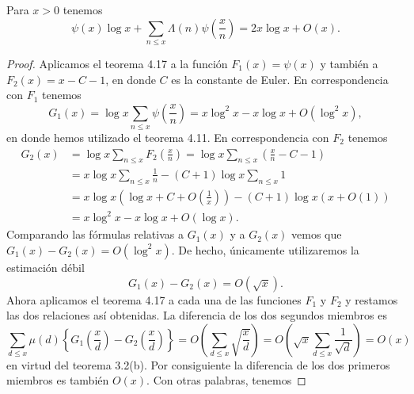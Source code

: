 \documentclass[12pt,a4paper]{book}
\begin{document}
    \begin{teorema}
        Para $x>0$ tenemos
        \begin{equation}
            \psi(x)\log x+\sum_{n\leq x}\Lambda(n)\psi\left(\frac{x}{n}\right)=2x\log x+O(x).
        \end{equation}
    \end{teorema}

    \begin{proof}
        Aplicamos el teorema 4.17 a la función $F_1(x)=\psi(x)$ y también a
        $F_2(x)=x-C-1$, en donde $C$ es la constante de Euler. En correspondencia con
        $F_1$ tenemos
        \begin{equation*}
            G_1(x)=\log x\sum_{n\leq x}\psi\left(\frac{x}{n}\right)=x\log^2x-x\log x+O(\log^2x),
        \end{equation*}
        en donde hemos utilizado el teorema 4.11. En correspondencia con $F_2$
        tenemos
        \begin{align*}
            G_2(x)&=\log x\sum_{n\leq x}F_2\left(\frac{x}{n}\right)=\log x\sum_{n\leq x}\left(\frac{x}{n}-C-1\right)\\
            &=x\log x\sum_{n\leq x}\frac{1}{n}-(C+1)\log x\sum_{n\leq x}1\\
            &=x\log x\left(\log x+C+O\left(\frac{1}{x}\right)\right)-(C+1)\log x(x+O(1))\\
            &=x\log^2x-x\log x+O(\log x).
        \end{align*}
        Comparando las fórmulas relativas a $G_1(x)$ y a $G_2(x)$ vemos que
        $G_1(x)-G_2(x)=O(\log^2x)$. De hecho, únicamente utilizaremos la estimación
        débil
        \begin{equation*}
            G_1(x)-G_2(x)=O(\sqrt{x}).
        \end{equation*}
        Ahora aplicamos el teorema 4.17 a cada una de las funciones $F_1$ y $F_2$ y
        restamos las dos relaciones así obtenidas. La diferencia de los dos segundos
        miembros es
        \begin{equation*}
            \sum_{d\leq x}\mu(d)\left\{G_1\left(\frac{x}{d}\right)-G_2\left(\frac{x}{d}\right)\right\}
            =O\left(\sum_{d\leq x}\sqrt{\frac{x}{d}}\right)=O\left(\sqrt{x}\sum_{d\leq x}\frac{1}{\sqrt{d}}\right)=O(x)
        \end{equation*}
        en virtud del teorema 3.2(b). Por consiguiente la diferencia de los dos
        primeros miembros es también $O(x)$. Con otras palabras, tenemos

\end{proof}
\end{document}
